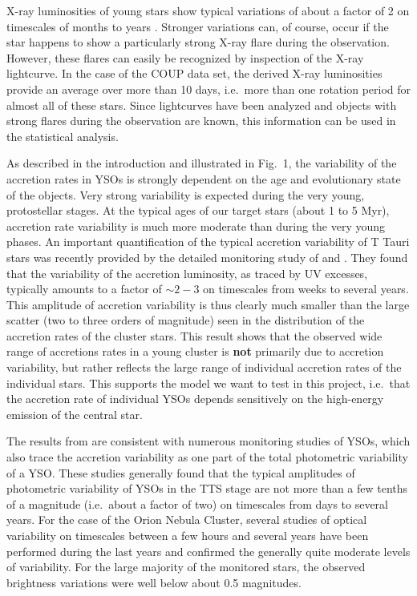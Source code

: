 \documentclass[10pt,fleqn,twoside]{article}
\begin{document}
\smallskip


X-ray luminosities of young stars show typical variations of about
a factor of 2 on timescales of months to years \citep[e.g.][]{Wolk04}.
Stronger variations can, of course,  occur if the star happens to show a
particularly strong X-ray flare during the observation. However,
these flares can easily be recognized by inspection of
the X-ray lightcurve.
%
In the case of the COUP data set, the derived X-ray luminosities
provide an average over more than 10 days, i.e.~more than one
rotation period for almost all of these stars.
Since lightcurves have been analyzed and objects with strong
flares during the observation are known, this information can
be used in the statistical analysis.

\medskip

As described in the introduction and illustrated in Fig.~1,
the variability of the accretion rates in YSOs is strongly dependent
on the age and evolutionary state of the objects.
Very strong variability is expected during the very young, protostellar stages.
%
At the typical ages of our target stars (about 1 to 5 Myr),
accretion rate variability is much more moderate than during the
very young phases.
%
An important quantification of the typical accretion variability of T Tauri stars
was recently
provided by the detailed monitoring study of 
\citet{Venuti14} and \citet{Venuti15}.
 They found that the variability of the accretion luminosity, as traced
by UV excesses, 
typically amounts to a factor of $\sim 2-3$ on timescales
from weeks to several years. This amplitude of accretion variability
is thus clearly much smaller than the large scatter 
(two to three orders of magnitude)
seen in the distribution of the accretion rates of the cluster stars.
This result shows that the observed wide range of accretions rates
in a young cluster is \textbf{not} primarily due to accretion variability, 
but rather reflects the large range of individual accretion rates of 
the individual stars.
This supports the model we want to test in this project, i.e.~that 
the accretion rate of individual YSOs depends sensitively on the high-energy 
emission of the central  star.

The results from \citet{Venuti14} are consistent with numerous monitoring
studies of YSOs, which also trace the accretion variability as one part
of the total photometric variability of a YSO.
%
%
These studies generally found that the typical
amplitudes of photometric variability of YSOs in the TTS stage
are not more than a few tenths of a magnitude (i.e.~about a factor of two)
on timescales from days to several years.
For the case of the Orion Nebula Cluster, several studies of 
optical variability
on timescales between a few hours and several years
have been performed during the last years
\citep{Herbst02,Stassun06,Stassun07,Parihar09,Rice15} and confirmed
the generally quite moderate levels of variability.
For the large majority of the monitored stars, the observed brightness 
variations were well below about 0.5 magnitudes.
\end{document}
